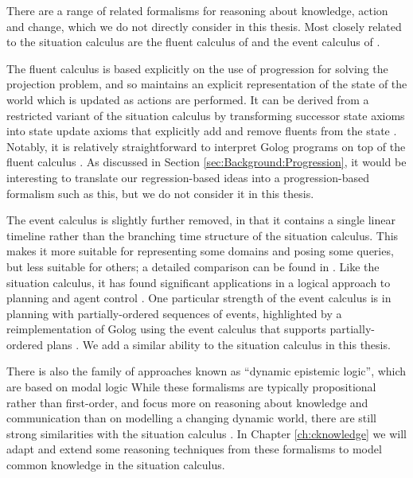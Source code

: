 \label{sec:Background:Related-Formalisms}

There are a range of related formalisms for reasoning about knowledge,
action and change, which we do not directly consider in this thesis.
Most closely related to the situation calculus are the fluent calculus
of \citet{thielscher98fluent_calculus} and the event calculus of
\citet{kowalski86event_calculus}.

The fluent calculus is based explicitly on the use of progression
for solving the projection problem, and so maintains an explicit representation
of the state of the world which is updated as actions are performed.
It can be derived from a restricted variant of the situation calculus
by transforming successor state axioms into state update axioms that
explicitly add and remove fluents from the state \citep{thielscher99fluentcalc_from_sitcalc}.
Notably, it is relatively straightforward to interpret Golog programs
on top of the fluent calculus \citep{thielscher05golog_in_flux}.
As discussed in Section \ref{sec:Background:Progression}, it would
be interesting to translate our regression-based ideas into a progression-based
formalism such as this, but we do not consider it in this thesis.

The event calculus is slightly further removed, in that it contains
a single linear timeline rather than the branching time structure
of the situation calculus. This makes it more suitable for representing
some domains and posing some queries, but less suitable for others;
a detailed comparison can be found in \citep{kowalski97reconcile_sitcalc_evtcalc,belleghem97sitcalc_evtcalc}.
Like the situation calculus, it has found significant applications
in a logical approach to planning and agent control \citep{shanahan00ec_planner}.
One particular strength of the event calculus is in planning with
partially-ordered sequences of events, highlighted by a reimplementation
of Golog using the event calculus that supports partially-ordered
plans \citep{pereira04ec_golog}. We add a similar ability to the
situation calculus in this thesis.

There is also the family of approaches known as {}``dynamic epistemic
logic'', which are based on modal logic \citep{baltag98pa_ck,vanBenthem06lcc,vanBentham06tree_of_knowledge}
While these formalisms are typically propositional rather than first-order,
and focus more on reasoning about knowledge and communication than
on modelling a changing dynamic world, there are still strong similarities
with the situation calculus \citep{vanbentham07ml_sitcalc}. In Chapter
\ref{ch:cknowledge} we will adapt and extend some reasoning techniques
from these formalisms to model common knowledge in the situation calculus.

